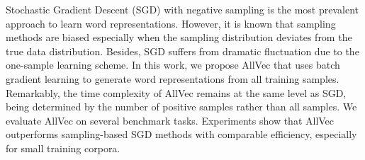 Stochastic Gradient Descent (SGD) with negative sampling is the most prevalent approach to learn word representations. However, it is known that sampling methods are biased especially when the sampling distribution deviates from the true data distribution. Besides, SGD suffers from dramatic fluctuation due to the one-sample learning scheme. In this work, we propose AllVec that uses batch gradient learning to generate word representations from all training samples. Remarkably, the time complexity of AllVec remains at the same level as SGD, being determined by the number of positive samples rather than all samples. We evaluate AllVec on several benchmark tasks. Experiments show that AllVec outperforms sampling-based SGD methods with comparable efficiency, especially for small training corpora.
